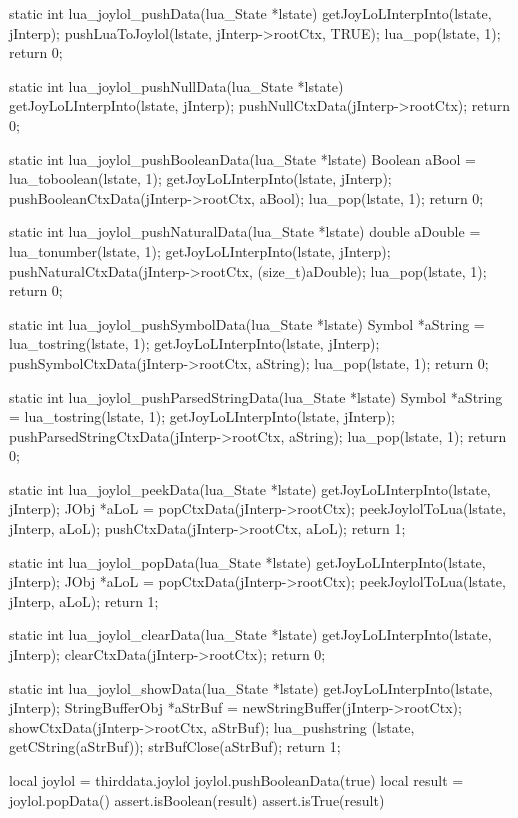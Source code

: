 \startCCode
static int lua_joylol_pushData(lua_State *lstate) {
  getJoyLoLInterpInto(lstate, jInterp);
  pushLuaToJoylol(lstate, jInterp->rootCtx, TRUE);
  lua_pop(lstate, 1);
  return 0;
}

static int lua_joylol_pushNullData(lua_State *lstate) {
  getJoyLoLInterpInto(lstate, jInterp);
  pushNullCtxData(jInterp->rootCtx);
  return 0;
}

static int lua_joylol_pushBooleanData(lua_State *lstate) {
  Boolean aBool = lua_toboolean(lstate, 1);
  getJoyLoLInterpInto(lstate, jInterp);
  pushBooleanCtxData(jInterp->rootCtx, aBool);
  lua_pop(lstate, 1);
  return 0;
}

static int lua_joylol_pushNaturalData(lua_State *lstate) {
  double aDouble = lua_tonumber(lstate, 1);
  getJoyLoLInterpInto(lstate, jInterp);
  pushNaturalCtxData(jInterp->rootCtx, (size_t)aDouble);
  lua_pop(lstate, 1);
  return 0;
}

static int lua_joylol_pushSymbolData(lua_State *lstate) {
  Symbol *aString = lua_tostring(lstate, 1);
  getJoyLoLInterpInto(lstate, jInterp);
  pushSymbolCtxData(jInterp->rootCtx, aString);
  lua_pop(lstate, 1);
  return 0;
}

static int lua_joylol_pushParsedStringData(lua_State *lstate) {
  Symbol *aString = lua_tostring(lstate, 1);
  getJoyLoLInterpInto(lstate, jInterp);
  pushParsedStringCtxData(jInterp->rootCtx, aString);
  lua_pop(lstate, 1);
  return 0;
}

static int lua_joylol_peekData(lua_State *lstate) {
  getJoyLoLInterpInto(lstate, jInterp);
  JObj *aLoL = popCtxData(jInterp->rootCtx);
  peekJoylolToLua(lstate, jInterp, aLoL);
  pushCtxData(jInterp->rootCtx, aLoL);
  return 1;
}

static int lua_joylol_popData(lua_State *lstate) {
  getJoyLoLInterpInto(lstate, jInterp);
  JObj *aLoL = popCtxData(jInterp->rootCtx);
  peekJoylolToLua(lstate, jInterp, aLoL);
  return 1;
}

static int lua_joylol_clearData(lua_State *lstate) {
  getJoyLoLInterpInto(lstate, jInterp);
  clearCtxData(jInterp->rootCtx);
  return 0;
}

static int lua_joylol_showData(lua_State *lstate) {
  getJoyLoLInterpInto(lstate, jInterp);
  StringBufferObj *aStrBuf = newStringBuffer(jInterp->rootCtx);
  showCtxData(jInterp->rootCtx, aStrBuf);
  lua_pushstring (lstate, getCString(aStrBuf));
  strBufClose(aStrBuf);
  return 1;
}
\stopCCode

\startLuaTest
  local joylol = thirddata.joylol
  joylol.pushBooleanData(true)
  local result = joylol.popData()
  assert.isBoolean(result)
  assert.isTrue(result)
  
